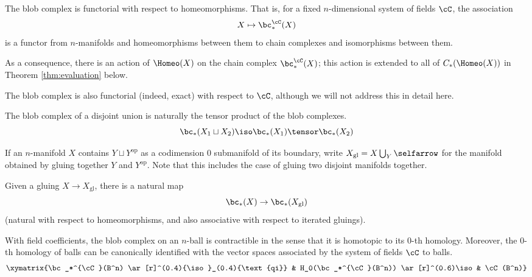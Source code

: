 \begin{property}[Functoriality]
\label{property:functoriality}%
The blob complex is functorial with respect to homeomorphisms.
That is, 
for a fixed $n$-dimensional system of fields $\cC$, the association
\begin{equation*}
X \mapsto \bc_*^{\cC}(X)
\end{equation*}
is a functor from $n$-manifolds and homeomorphisms between them to chain 
complexes and isomorphisms between them.
\end{property}
As a consequence, there is an action of $\Homeo(X)$ on the chain complex $\bc_*^\cC(X)$; 
this action is extended to all of $C_*(\Homeo(X))$ in Theorem \ref{thm:evaluation} below.

The blob complex is also functorial (indeed, exact) with respect to $\cC$, 
although we will not address this in detail here.

\begin{property}
\label{property:disjoint-union}
The blob complex of a disjoint union is naturally the tensor product of the blob complexes.
\begin{equation*}
\bc_*(X_1 \du X_2) \iso \bc_*(X_1) \tensor \bc_*(X_2)
\end{equation*}
\end{property}

If an $n$-manifold $X$ contains $Y \sqcup Y^\text{op}$ as a codimension $0$ submanifold of its boundary, 
write $X_\text{gl} = X \bigcup_{Y}\selfarrow$ for the manifold obtained by gluing together $Y$ and $Y^\text{op}$.
Note that this includes the case of gluing two disjoint manifolds together.
\begin{property}
\label{property:gluing-map}%
Given a gluing $X \to X_\mathrm{gl}$, there is
a natural map
\[
	\bc_*(X) \to \bc_*(X_\mathrm{gl}) 
\]
(natural with respect to homeomorphisms, and also associative with respect to iterated gluings).
\end{property}

\begin{property}[Contractibility]
\label{property:contractibility}%
With field coefficients, the blob complex on an $n$-ball is contractible in the sense that it is homotopic to its $0$-th homology.
Moreover, the $0$-th homology of balls can be canonically identified with the vector spaces associated by the system of fields $\cC$ to balls.
\begin{equation*}
\xymatrix{\bc_*^{\cC}(B^n) \ar[r]^(0.4){\iso}_(0.4){\text{qi}} & H_0(\bc_*^{\cC}(B^n)) \ar[r]^(0.6)\iso & \cC(B^n)}
\end{equation*}
\end{property}


